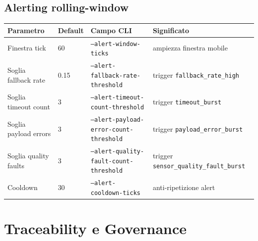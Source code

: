 ﻿\documentclass[11pt,a4paper]{report}
\begin{document}
\section{Alerting rolling-window}
\begin{longtable}{@{}p{4.0cm}p{2.3cm}p{2.3cm}p{4.6cm}@{}}
\toprule
Parametro & Default & Campo CLI & Significato \\ \midrule
Finestra tick & 60 & \texttt{--alert-window-ticks} & ampiezza finestra mobile \\
Soglia fallback rate & 0.15 & \texttt{--alert-fallback-rate-threshold} & trigger \texttt{fallback\_rate\_high} \\
Soglia timeout count & 3 & \texttt{--alert-timeout-count-threshold} & trigger \texttt{timeout\_burst} \\
Soglia payload errors & 3 & \texttt{--alert-payload-error-count-threshold} & trigger \texttt{payload\_error\_burst} \\
Soglia quality faults & 3 & \texttt{--alert-quality-fault-count-threshold} & trigger \texttt{sensor\_quality\_fault\_burst} \\
Cooldown & 30 & \texttt{--alert-cooldown-ticks} & anti-ripetizione alert \\
\bottomrule
\end{longtable}

\newpage
\chapter{Traceability e Governance}
\end{document}
